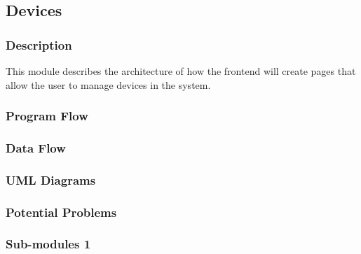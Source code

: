
\subsection{Devices}

\subsubsection{Description}

This module describes the architecture of how the frontend will create pages that allow the user to manage devices in the system.

\subsubsection{Program Flow}


\subsubsection{Data Flow}


\subsubsection{UML Diagrams}


\subsubsection{Potential Problems}


\subsubsection{Sub-modules 1}

